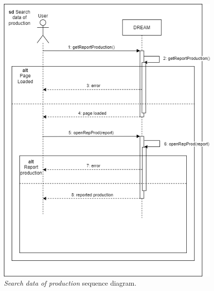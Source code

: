 \begin{figure}[H]
    \centering
    \includegraphics[width=\linewidth]{Images/Use Case/UC12.png}
    \caption{\textit{Search data of production} sequence diagram.}
\end{figure}
\newpage

